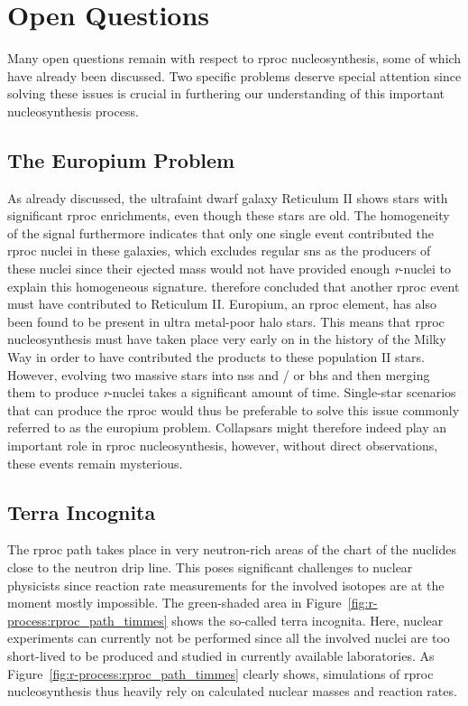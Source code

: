 \section{Open Questions}

Many open questions remain with respect to \ac{rproc} nucleosynthesis, some of which have already been discussed. Two specific problems deserve special attention since solving these issues is crucial in furthering our understanding of this important nucleosynthesis process.


\subsection{The Europium Problem}

As already discussed, the ultrafaint dwarf galaxy Reticulum II shows stars with significant \ac{rproc} enrichments, even though these stars are old. The homogeneity of the signal furthermore indicates that only one single event contributed the \ac{rproc} nuclei in these galaxies, which excludes regular \acp{sn} as the producers of these nuclei since their ejected mass would not have provided enough \textit{r}-nuclei to explain this homogeneous signature. \citet{ji16} therefore concluded that another \ac{rproc} event must have contributed to Reticulum II. Europium, an \ac{rproc} element, has also been found to be present in ultra metal-poor halo stars. This means that \ac{rproc} nucleosynthesis must have taken place very early on in the history of the Milky Way in order to have contributed the products to these population II stars. However, evolving two massive stars into \acp{ns} and / or \acp{bh} and then merging them to produce \textit{r}-nuclei takes a significant amount of time. Single-star scenarios that can produce the \ac{rproc} would thus be preferable to solve this issue commonly referred to as the europium problem. Collapsars might therefore indeed play an important role in \ac{rproc} nucleosynthesis, however, without direct observations, these events remain mysterious.

\subsection{Terra Incognita}

The \ac{rproc} path takes place in very neutron-rich areas of the chart of the nuclides close to the neutron drip line. This poses significant challenges to nuclear physicists since reaction rate measurements for the involved isotopes are at the moment mostly impossible. The green-shaded area in Figure~\ref{fig:r-process:rproc_path_timmes} shows the so-called terra incognita. Here, nuclear experiments can currently not be performed since all the involved nuclei are too short-lived to be produced and studied in currently available laboratories. As Figure~\ref{fig:r-process:rproc_path_timmes} clearly shows, simulations of \ac{rproc} nucleosynthesis thus heavily rely on calculated nuclear masses and reaction rates. 

